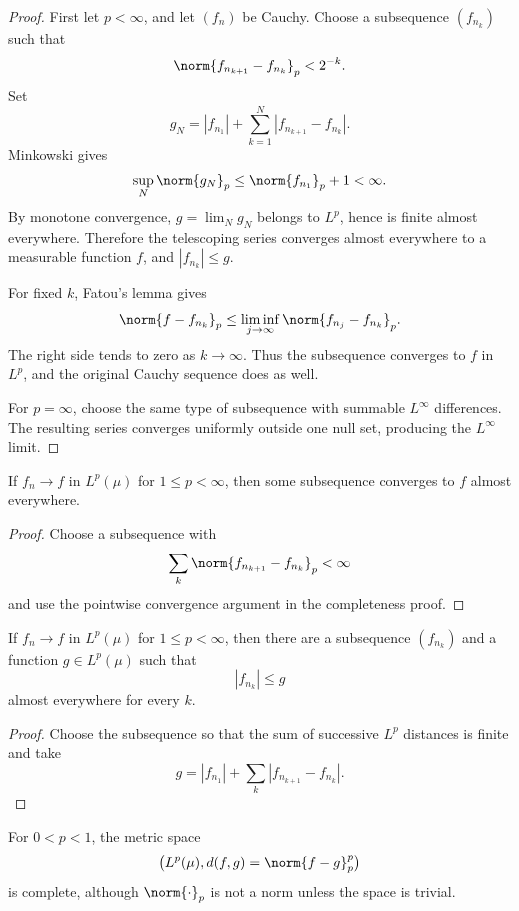 \begin{proof}
First let $p<\infty$, and let $(f_n)$ be Cauchy. Choose a subsequence $(f_{n_k})$ such that
\[
\norm{f_{n_{k+1}}-f_{n_k}}_p<2^{-k}.
\]
Set
\[
g_N=|f_{n_1}|+\sum_{k=1}^{N}|f_{n_{k+1}}-f_{n_k}|.
\]
Minkowski gives
\[
\sup_N\norm{g_N}_p
\leq\norm{f_{n_1}}_p+1<\infty.
\]
By monotone convergence, $g=\lim_Ng_N$ belongs to $L^p$, hence is finite almost everywhere. Therefore the telescoping series converges almost everywhere to a measurable function $f$, and $|f_{n_k}|\leq g$.

For fixed $k$, Fatou's lemma gives
\[
\norm{f-f_{n_k}}_p
\leq\liminf_{j\to\infty}\norm{f_{n_j}-f_{n_k}}_p.
\]
The right side tends to zero as $k\to\infty$. Thus the subsequence converges to $f$ in $L^p$, and the original Cauchy sequence does as well.

For $p=\infty$, choose the same type of subsequence with summable $L^\infty$ differences. The resulting series converges uniformly outside one null set, producing the $L^\infty$ limit.
\end{proof}

\begin{cor}
If $f_n\to f$ in $L^p(\mu)$ for $1\leq p<\infty$, then some subsequence converges to $f$ almost everywhere.
\end{cor}

\begin{proof}
Choose a subsequence with
\[
\sum_k\norm{f_{n_{k+1}}-f_{n_k}}_p<\infty
\]
and use the pointwise convergence argument in the completeness proof.
\end{proof}

\begin{cor}
If $f_n\to f$ in $L^p(\mu)$ for $1\leq p<\infty$, then there are a subsequence $(f_{n_k})$ and a function $g\in L^p(\mu)$ such that
\[
|f_{n_k}|\leq g
\]
almost everywhere for every $k$.
\end{cor}

\begin{proof}
Choose the subsequence so that the sum of successive $L^p$ distances is finite and take
\[
g=|f_{n_1}|+\sum_k|f_{n_{k+1}}-f_{n_k}|.
\]
\end{proof}

\begin{prop}
For $0<p<1$, the metric space
\[
\bigl(L^p(\mu),d(f,g)=\norm{f-g}_p^p\bigr)
\]
is complete, although $\norm{\cdot}_p$ is not a norm unless the space is trivial.
\end{prop}

